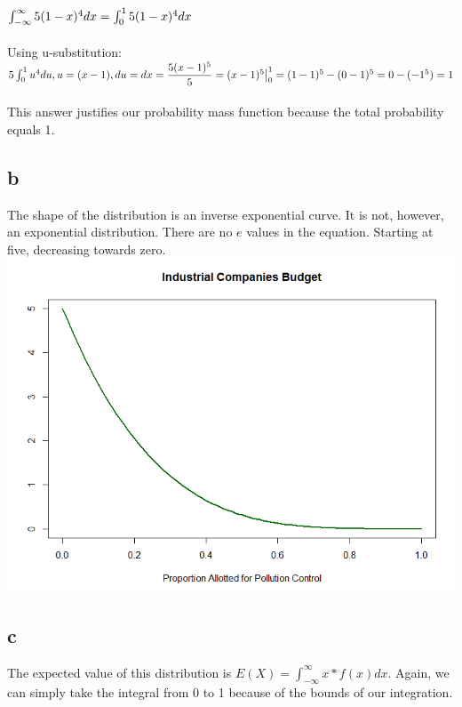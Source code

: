 \documentclass[10pt,letterpaper]{article}
\begin{document}
$\int_{-\infty}^{\infty}5(1-x)^4dx\\\\
=\int_{0}^{1}5(1-x)^4dx\\$\\
\\
Using u-substitution:\\
$5\int_{0}^{1}u^4du, u=(x-1), du=dx\\\\
=\dfrac{5(x-1)^5}{5}=(x-1)^5\big|_0^1\\\\
=(1-1)^5-(0-1)^5=0-(-1^5)=1$\\\\
This answer justifies our probability mass function because the total
probability equals 1. 

\subsection*{b}
The shape of the distribution is an inverse exponential curve. It is not,
however, an exponential distribution. There are no $e$ values in the equation.
Starting at five, decreasing towards zero.\\
\includegraphics[scale=.75]{busPMF}
\subsection*{c}
The expected value of this distribution is $E(X)=\int_{-\infty}^{\infty}x*f(x)dx$.
Again, we can simply take the integral from 0 to 1 because of the bounds of our
integration.\\
\end{document}
